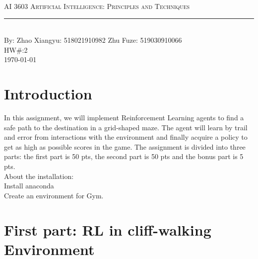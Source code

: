 \documentclass[aps,letterpaper,10pt]{revtex4}
\newcommand{\labtitle}{AI 3603 Artificial Intelligence: Principles and Techniques}
\newcommand{\authorname}{Zhao Xiangyu: 518021910982   Zhu Fuze: 519030910066}
\newcommand{\hw}{2}
\begin{document}


\begin{titlepage}
\begin{center}
{\Large \textsc{\labtitle} \\ \vspace{4pt}}
\rule[13pt]{\textwidth}{1pt} \\ \vspace{150pt}
{\large By: \authorname \\ \vspace{10pt}
HW\#:\hw \\ \vspace{10pt}
\today}
\end{center}
\end{titlepage}





\section{Introduction}


In this assignment, we will implement Reinforcement Learning agents to find a safe path to the destination in a grid-shaped maze. The agent will learn by trail and error from interactions with the environment and finally acquire a policy to get as high as possible scores in the game. The assignment is divided into three parts: the first part is 50 pts, the second part is 50 pts and the bonus part is 5 pts.
\\About the installation:
\\Install anaconda
\\Create an environment for Gym.



\section{First part: RL in cliff-walking Environment}
\end{document}
